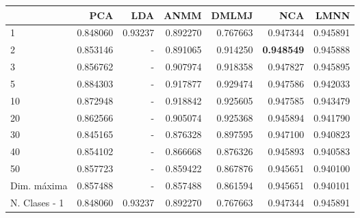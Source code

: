 \begin{tabular}{lrrrrrr}
\toprule
{} &       PCA &      LDA &      ANMM &     DMLMJ &       NCA &      LMNN \\
\midrule
1             &  0.848060 &  0.93237 &  0.892270 &  0.767663 &  0.947344 &  0.945891 \\
2             &  0.853146 &  -       &  0.891065 &  0.914250 &  \textbf{0.948549} &  0.945888 \\
3             &  0.856762 &  -       &  0.907974 &  0.918358 &  0.947827 &  0.945895 \\
5             &  0.884303 &  -       &  0.917877 &  0.929474 &  0.947586 &  0.942033 \\
10            &  0.872948 &  -       &  0.918842 &  0.925605 &  0.947585 &  0.943479 \\
20            &  0.862566 &  -       &  0.905074 &  0.925368 &  0.945894 &  0.941790 \\
30            &  0.845165 &  -       &  0.876328 &  0.897595 &  0.947100 &  0.940823 \\
40            &  0.854102 &  -       &  0.866668 &  0.876326 &  0.945893 &  0.940583 \\
50            &  0.857723 &  -       &  0.859422 &  0.867876 &  0.945651 &  0.940100 \\
Dim. máxima   &  0.857488 &  -       &  0.857488 &  0.861594 &  0.945651 &  0.940101 \\
N. Clases - 1 &  0.848060 &  0.93237 &  0.892270 &  0.767663 &  0.947344 &  0.945891 \\
\bottomrule
\end{tabular}
